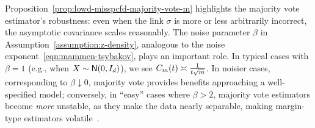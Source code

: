Proposition~\ref{prop:lowd-misspcfd-majority-vote-m} highlights the
majority vote estimator's robustness: even when the link $\sigma$ is more
or less arbitrarily incorrect, the asymptotic covariance
scales reasonably. The noise parameter $\beta$ in
Assumption~\ref{assumption:z-density}, analogous
to the noise exponent~\eqref{eqn:mammen-tsybakov}, plays
an important role. In typical cases with $\beta = 1$ (e.g., when
$X \sim \mathsf{N}(0, I_d)$), we see $C_m(t) \asymp \frac{1}{t \sqrt{m}}$.
In noisier cases, corresponding to $\beta \downarrow 0$, majority vote
provides benefits approaching a well-specified model; conversely,
in ``easy'' cases where $\beta > 2$, majority vote estimators become
\emph{more} unstable, as they make the data nearly separable,
making margin-type estimators
volatile~\cite{CandesSu19pnas}.
